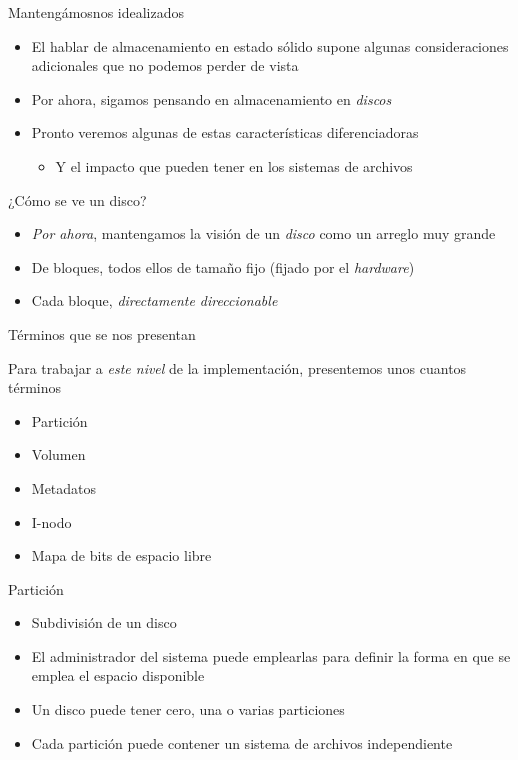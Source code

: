 \documentclass[presentation]{beamer}
\begin{document}
\begin{frame}[label={sec:org802b3db}]{Mantengámosnos idealizados}
\begin{itemize}
\item El hablar de almacenamiento en estado sólido supone algunas
consideraciones adicionales que no podemos perder de vista
\item Por ahora, sigamos pensando en almacenamiento en \emph{discos}
\item Pronto veremos algunas de estas características diferenciadoras
\begin{itemize}
\item Y el impacto que pueden tener en los sistemas de archivos
\end{itemize}
\end{itemize}
\end{frame}

\begin{frame}[label={sec:org0872f99}]{¿Cómo se ve un disco?}
\begin{itemize}
\item \emph{Por ahora}, mantengamos la visión de un \emph{disco} como un arreglo
muy grande
\item De bloques, todos ellos de tamaño fijo (fijado por el \emph{hardware})
\item Cada bloque, \emph{directamente direccionable}
\end{itemize}
\end{frame}

\begin{frame}[label={sec:org90230c5}]{Términos que se nos presentan}
\begin{center}
Para trabajar a \emph{este nivel} de la implementación, presentemos unos
cuantos términos
\end{center}
\begin{itemize}
\item Partición
\item Volumen
\item Metadatos
\item I-nodo
\item Mapa de bits de espacio libre
\end{itemize}
\end{frame}

\begin{frame}[label={sec:org16d0f6d}]{Partición}
\begin{itemize}
\item Subdivisión de un disco
\item El administrador del sistema puede emplearlas para definir la forma
en que se emplea el espacio disponible
\item Un disco puede tener cero, una o varias particiones
\item Cada partición puede contener un sistema de archivos independiente
\end{itemize}
\end{frame}
\end{document}
